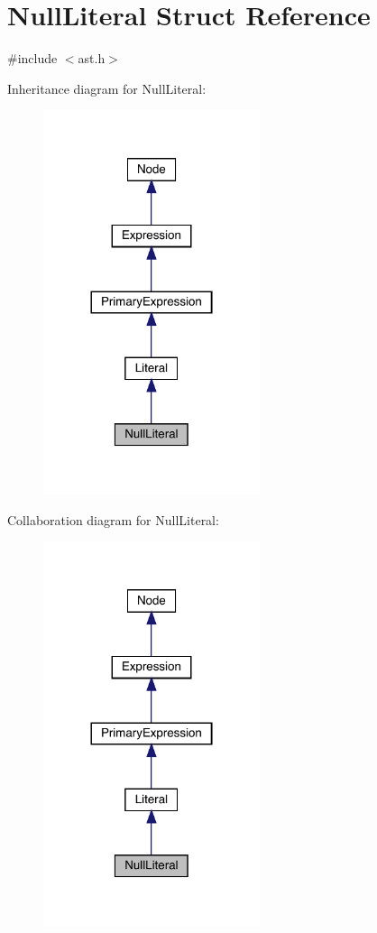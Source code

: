\hypertarget{struct_null_literal}{}\section{Null\+Literal Struct Reference}
\label{struct_null_literal}


{\ttfamily \#include $<$ast.\+h$>$}



Inheritance diagram for Null\+Literal\+:
\nopagebreak
\begin{figure}[H]
\begin{center}
\leavevmode
\includegraphics[width=180pt]{struct_null_literal__inherit__graph}
\end{center}
\end{figure}


Collaboration diagram for Null\+Literal\+:
\nopagebreak
\begin{figure}[H]
\begin{center}
\leavevmode
\includegraphics[width=180pt]{struct_null_literal__coll__graph}
\end{center}
\end{figure}

